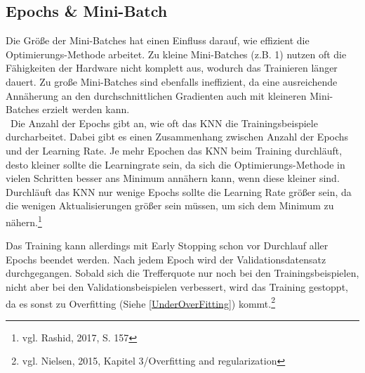 \documentclass[
	a4paper,
	12pt,
	ngerman,
	oneside
]{scrreprt}											%
\begin{document}
			\subsection{Epochs \& Mini-Batch}\label{EpochsUndMiniBatch}
				Die Größe der Mini-Batches hat einen Einfluss darauf, wie effizient die Optimierungs-Methode arbeitet. Zu kleine Mini-Batches (z.B. 1) nutzen oft die Fähigkeiten der Hardware nicht komplett aus, wodurch das Trainieren länger dauert. Zu große Mini-Batches sind ebenfalls ineffizient, da eine ausreichende Annäherung an den durchschnittlichen Gradienten auch mit kleineren Mini-Batches erzielt werden kann.
				\\\
				Die Anzahl der Epochs gibt an, wie oft das KNN die Trainingsbeispiele durcharbeitet. Dabei gibt es einen Zusammenhang zwischen Anzahl der Epochs und der Learning Rate. Je mehr Epochen das KNN beim Training durchläuft, desto kleiner sollte die Learningrate sein, da sich die Optimierungs-Methode in vielen Schritten besser ans Minimum annähern kann, wenn diese kleiner sind. Durchläuft das KNN nur wenige Epochs sollte die Learning Rate größer sein, da die wenigen Aktualisierungen größer sein müssen, um sich dem Minimum zu nähern.\footnote{vgl. Rashid, 2017, S. 157}
	
				Das Training kann allerdings mit Early Stopping schon vor Durchlauf aller Epochs beendet werden. Nach jedem Epoch wird der Validationsdatensatz durchgegangen. Sobald sich die Trefferquote nur noch bei den Trainingsbeispielen, nicht aber bei den Validationsbeispielen verbessert, wird das Training gestoppt, da es sonst zu Overfitting (Siehe \ref{UnderOverFitting}) kommt.\footnote{vgl. Nielsen, 2015, Kapitel 3/Overfitting and regularization}
		
\end{document}
